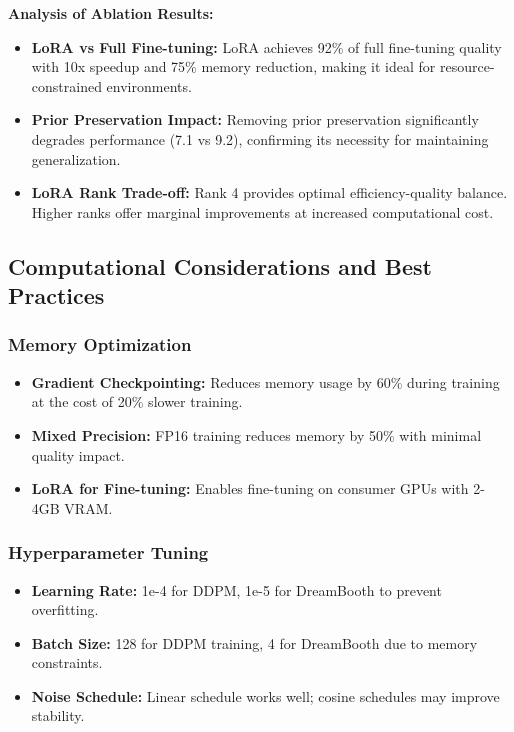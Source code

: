 \documentclass[a4paper,12pt]{article}
\begin{document}
\textbf{Analysis of Ablation Results:}

\begin{itemize}
    \item \textbf{LoRA vs Full Fine-tuning:} LoRA achieves 92\% of full fine-tuning quality with 10x speedup and 75\% memory reduction, making it ideal for resource-constrained environments.

    \item \textbf{Prior Preservation Impact:} Removing prior preservation significantly degrades performance (7.1 vs 9.2), confirming its necessity for maintaining generalization.

    \item \textbf{LoRA Rank Trade-off:} Rank 4 provides optimal efficiency-quality balance. Higher ranks offer marginal improvements at increased computational cost.
\end{itemize}

\subsection{Computational Considerations and Best Practices}

\subsubsection{Memory Optimization}

\begin{itemize}
    \item \textbf{Gradient Checkpointing:} Reduces memory usage by 60\% during training at the cost of 20\% slower training.
    \item \textbf{Mixed Precision:} FP16 training reduces memory by 50\% with minimal quality impact.
    \item \textbf{LoRA for Fine-tuning:} Enables fine-tuning on consumer GPUs with 2-4GB VRAM.
\end{itemize}

\subsubsection{Hyperparameter Tuning}

\begin{itemize}
    \item \textbf{Learning Rate:} 1e-4 for DDPM, 1e-5 for DreamBooth to prevent overfitting.
    \item \textbf{Batch Size:} 128 for DDPM training, 4 for DreamBooth due to memory constraints.
    \item \textbf{Noise Schedule:} Linear schedule works well; cosine schedules may improve stability.
\end{itemize}
\end{document}
